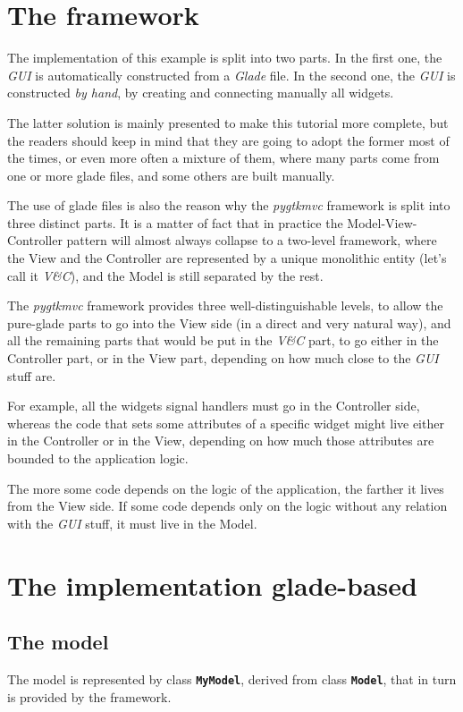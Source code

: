 \documentclass{article}
\newcommand{\kw}[1]{\emph{#1}\xspace}
\newcommand{\appl}[1]{\textsl{#1}\xspace}
\newcommand{\glade}{\appl{Glade}}
\newcommand{\gui}{\kw{GUI}}
\newcommand{\pygtkmvc}{\kw{pygtkmvc}}
\newcommand{\codename}[1]{\texttt{\bfseries \textcolor {codecolor}{#1}}\xspace}
\newcommand{\vc}{\kw{V\&C}}
\begin{document}
\section{The framework}
The implementation of this example is split into two parts. In the
first one, the \gui is automatically constructed from a \glade file.
In the second one, the \gui is constructed \emph{by hand}, by creating
and connecting manually all widgets.

The latter solution is mainly presented to make this tutorial more
complete, but the readers should keep in mind that they are going to
adopt the former most of the times, or even more often a mixture of
them, where many parts come from one or more glade files, and some
others are built manually.

The use of glade files is also the reason why the \pygtkmvc framework
is split into three distinct parts. It is a matter of fact that in
practice the Model-View-Controller pattern will almost always collapse
to a two-level framework, where the View and the Controller are
represented by a unique monolithic entity (let's call it \vc),
and the Model is still separated by the rest.

The \pygtkmvc framework provides three well-distinguishable levels, to
allow the pure-glade parts to go into the View side (in a direct and
very natural way), and all the remaining parts that would be put in
the \vc part, to go either in the Controller part, or in the View
part, depending on how much close to the \gui stuff are.

For example, all the widgets signal handlers must go in the Controller
side, whereas the code that sets some attributes of a specific widget
might live either in the Controller or in the View, depending on how
much those attributes are bounded to the application logic.

The more some code depends on the logic of the application, the
farther it lives from the View side. If some code depends only on the
logic without any relation with the \gui stuff, it must live in the
Model.


\section{The implementation glade-based}

\subsection{The model}
The model is represented by class \codename{MyModel}, derived from
class \codename{Model}, that in turn is provided by the framework.
\end{document}
